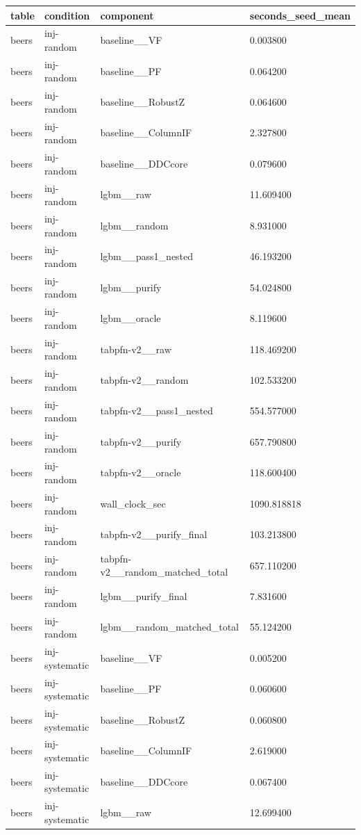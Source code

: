 \begin{tabular}{llll}
\hline
table & condition & component & seconds\_seed\_mean \\
\hline
beers & inj-random & baseline\_\_VF & 0.003800 \\
beers & inj-random & baseline\_\_PF & 0.064200 \\
beers & inj-random & baseline\_\_RobustZ & 0.064600 \\
beers & inj-random & baseline\_\_ColumnIF & 2.327800 \\
beers & inj-random & baseline\_\_DDCcore & 0.079600 \\
beers & inj-random & lgbm\_\_raw & 11.609400 \\
beers & inj-random & lgbm\_\_random & 8.931000 \\
beers & inj-random & lgbm\_\_pass1\_nested & 46.193200 \\
beers & inj-random & lgbm\_\_purify & 54.024800 \\
beers & inj-random & lgbm\_\_oracle & 8.119600 \\
beers & inj-random & tabpfn-v2\_\_raw & 118.469200 \\
beers & inj-random & tabpfn-v2\_\_random & 102.533200 \\
beers & inj-random & tabpfn-v2\_\_pass1\_nested & 554.577000 \\
beers & inj-random & tabpfn-v2\_\_purify & 657.790800 \\
beers & inj-random & tabpfn-v2\_\_oracle & 118.600400 \\
beers & inj-random & wall\_clock\_sec & 1090.818818 \\
beers & inj-random & tabpfn-v2\_\_purify\_final & 103.213800 \\
beers & inj-random & tabpfn-v2\_\_random\_matched\_total & 657.110200 \\
beers & inj-random & lgbm\_\_purify\_final & 7.831600 \\
beers & inj-random & lgbm\_\_random\_matched\_total & 55.124200 \\
beers & inj-systematic & baseline\_\_VF & 0.005200 \\
beers & inj-systematic & baseline\_\_PF & 0.060600 \\
beers & inj-systematic & baseline\_\_RobustZ & 0.060800 \\
beers & inj-systematic & baseline\_\_ColumnIF & 2.619000 \\
beers & inj-systematic & baseline\_\_DDCcore & 0.067400 \\
beers & inj-systematic & lgbm\_\_raw & 12.699400 \\

\end{tabular}
